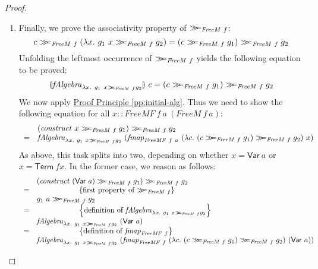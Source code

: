 \documentclass{jfp1}
\newcommand{\fold}[1]{\llparenthesis #1 \rrparenthesis}
\newcommand{\mbind}{\mathrel{>\kern-0.45em>\kern-0.45em=}}
\newcommand{\eqAnnotation}[1]{\hspace{2cm}\left\{\textrm{#1}\right\}}
\newcommand{\proofprinref}[1]{\hyperref[#1]{Proof Principle \ref*{#1}}}
\begin{document}
\begin{proof}
\begin{enumerate}
  \item Finally, we prove the associativity property of
    $\mbind_{\mathit{FreeM}~f}$:
    \begin{displaymath}
      c \mbind_{\mathit{FreeM}~f} (\lambda x.~g_1~x \mbind_{\mathit{FreeM}~f} g_2) = (c \mbind_{\mathit{FreeM}~f} g_1) \mbind_{\mathit{FreeM}~f} g_2
    \end{displaymath}
    Unfolding the leftmost occurrence of $\mbind_{\mathit{FreeM}~f}$
    yields the following equation to be proved:
    \begin{displaymath}
      \fold{\mathit{fAlgebra}_{\lambda x.~g_1~x \mbind_{\mathit{FreeM}~f} g_2}}~c = (c \mbind_{\mathit{FreeM}~f} g_1) \mbind_{\mathit{FreeM}~f} g_2
    \end{displaymath}
    We now apply \proofprinref{pp:initial-alg}. Thus we need to show
    the following equation for all $x ::
    \mathit{FreeMF}~f~a~(\mathit{FreeM}~f~a)$:
    \begin{displaymath}
      \begin{array}{cl}
        &(\mathit{construct}~x \mbind_{\mathit{FreeM}~f} g_1) \mbind_{\mathit{FreeM}~f} g_2\\
        = &\mathit{fAlgebra}_{\lambda x.~g_1~x \mbind_{\mathit{FreeM}~f} g_2}~(\mathit{fmap}_{\mathit{FreeMF}~f~a}~(\lambda c.~(c \mbind_{\mathit{FreeM}~f} g_1) \mbind_{\mathit{FreeM}~f} g_2)~x)
      \end{array}
    \end{displaymath}
    As above, this task splits into two, depending on whether $x =
    \mathsf{Var}~a$ or $x = \mathsf{Term}~\mathit{fx}$. In the former
    case, we reason as follows:
    \begin{displaymath}
      \begin{array}{cl}
        & (\mathit{construct}~(\mathsf{Var}~a) \mbind_{\mathit{FreeM}~f} g_1) \mbind_{\mathit{FreeM}~f} g_2\\
        =&\eqAnnotation{first property of $\mbind_{\mathit{FreeM}~f}$} \\
        & g_1~a \mbind_{\mathit{FreeM}~f} g_2 \\
        =&\eqAnnotation{definition of $\mathit{fAlgebra}_{\lambda x.~g_1~x \mbind_{\mathit{FreeM}~f} g_2}$}\\
        & \mathit{fAlgebra}_{\lambda x.~g_1~x \mbind_{\mathit{FreeM}~f} g_2}~(\mathsf{Var}~a) \\
        =&\eqAnnotation{definition of $\mathit{fmap}_{\mathit{FreeMF}~f}$} \\
        & \mathit{fAlgebra}_{\lambda x.~g_1~x \mbind_{\mathit{FreeM}~f} g_2}~(\mathit{fmap}_{\mathit{FreeMF}~f}~(\lambda c.~(c \mbind_{\mathit{FreeM}~f} g_1) \mbind_{\mathit{FreeM}~f} g_2)~(\mathsf{Var}~a))

\end{array}
\end{displaymath}
\end{enumerate}
\end{proof}
\end{document}
